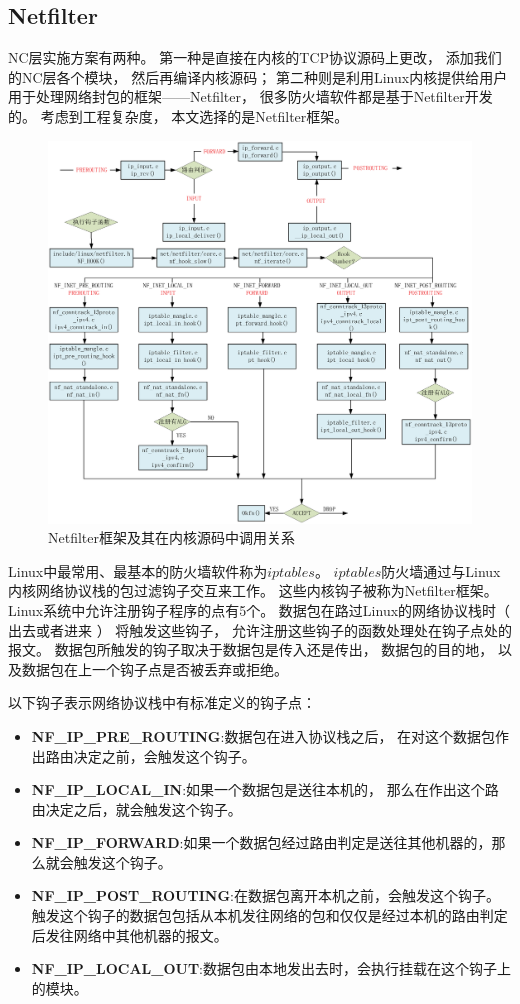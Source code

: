 \subsection{Netfilter}
NC层实施方案有两种。
第一种是直接在内核的TCP协议源码上更改，
添加我们的NC层各个模块，
然后再编译内核源码；
第二种则是利用Linux内核提供给用户用于处理网络封包的框架——Netfilter，
很多防火墙软件都是基于Netfilter开发的。
考虑到工程复杂度，
本文选择的是Netfilter框架。
\begin{figure}[htbp]
	\centering
	\includegraphics[width=6in]{figures/packetflow.eps}
	\caption{Netfilter框架及其在内核源码中调用关系}
	\label{NETFILTER_EPS}
\end{figure}
Linux中最常用、最基本的防火墙软件称为$iptables$。
$iptables$防火墙通过与Linux内核网络协议栈的包过滤钩子交互来工作。
这些内核钩子被称为Netfilter框架。
Linux系统中允许注册钩子程序的点有5个。
数据包在路过Linux的网络协议栈时（ 出去或者进来 ） 将触发这些钩子，
允许注册这些钩子的函数处理处在钩子点处的报文。
数据包所触发的钩子取决于数据包是传入还是传出，
数据包的目的地，
以及数据包在上一个钩子点是否被丢弃或拒绝。
\par
以下钩子表示网络协议栈中有标准定义的钩子点：
\begin{itemize}[leftmargin=.5in]
	\item \textbf{NF\_IP\_PRE\_ROUTING}:数据包在进入协议栈之后，
	在对这个数据包作出路由决定之前，会触发这个钩子。
	\item \textbf{NF\_IP\_LOCAL\_IN}:如果一个数据包是送往本机的，
	那么在作出这个路由决定之后，就会触发这个钩子。
	\item \textbf{NF\_IP\_FORWARD}:如果一个数据包经过路由判定是送往其他机器的，那么就会触发这个钩子。
	\item \textbf{NF\_IP\_POST\_ROUTING}:在数据包离开本机之前，会触发这个钩子。
	触发这个钩子的数据包包括从本机发往网络的包和仅仅是经过本机的路由判定后发往网络中其他机器的报文。
	\item \textbf{NF\_IP\_LOCAL\_OUT}:数据包由本地发出去时，会执行挂载在这个钩子上的模块。
\end{itemize}
